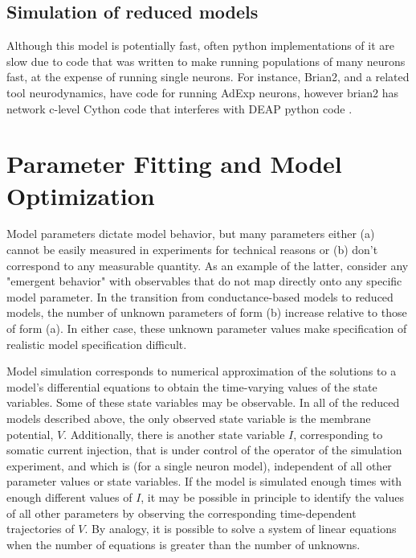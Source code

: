
\subsection{Simulation of reduced models}
Although this model is potentially fast, often python implementations of it are slow due to code that was written to make running populations of many neurons fast, at the expense of running single neurons. 
For instance, Brian2, and a related tool neurodynamics, have code for running AdExp neurons, however brian2 has network c-level Cython code that interferes with DEAP python code \cite{DEAP_JMLR2012}.
\\
\section{Parameter Fitting and Model Optimization}
Model parameters dictate model behavior, but many parameters either (a) cannot be easily measured in experiments for technical reasons or (b) don't correspond to any measurable quantity.
As an example of the latter, consider any "emergent behavior" with observables that do not map directly onto any specific model parameter.
In the transition from conductance-based models to reduced models, the number of unknown parameters of form (b) increase relative to those of form (a).
In either case, these unknown parameter values make specification of realistic model specification difficult.

Model simulation corresponds to numerical approximation of the solutions to a model's differential equations to obtain the time-varying values of the state variables.
Some of these state variables may be observable.
In all of the reduced models described above, the only observed state variable is the membrane potential, $V$.
Additionally, there is another state variable $I$, corresponding to somatic current injection, that is under control of the operator of the simulation experiment, and which is (for a single neuron model), independent of all other parameter values or state variables.
If the model is simulated enough times with enough different values of $I$, it may be possible in principle to identify the values of all other parameters by observing the corresponding time-dependent trajectories of $V$.
By analogy, it is possible to solve a system of linear equations when the number of equations is greater than the number of unknowns.

